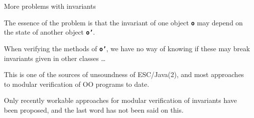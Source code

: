 \documentclass[
pdf,
nocolorBG,
slideColor,
erik,
]{prosper}
\newcommand{\code}[1]{{\rm \texttt{\textbf{\small #1}}}}
\begin{document}
\begin{slide}{More problems with invariants}
\vspace*{-4ex}

The essence of the problem is that the invariant of
one object \code{o} may depend on the state of another object \code{o'}.

\medskip

When verifying the methods of \code{o'}, we have no way of knowing 
if these may break invariants given in other classes \ldots

\medskip

This is one of the sources of unsoundness of ESC/Java(2),
and most approaches to modular verification of OO programs to date.

\medskip

Only recently workable approaches for modular verification of invariants 
have been proposed, and the last word has not been said on this.

\end{slide}
\end{document}
